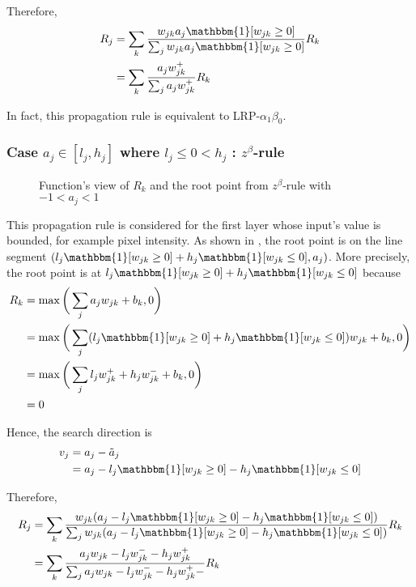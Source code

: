 Therefore, 
\begin{align}
		R_j &=	\sum_k \frac{ w_{jk} a_j \mathbbm{1}[w_{jk}  \ge 0 ]  }{\sum_{j} w_{jk} a_j \mathbbm{1}[ w_{jk}  \ge 0 ]}  R_k\\
		&=	\sum_k  \frac{ a_j  w_{jk}^+   }{\sum_{j}  a_j w_{jk}^+  }  R_k
\end{align}

In fact, this propagation rule is equivalent to LRP-$\alpha_1\beta_0$. 


\subsubsection{Case $a_j \in [l_j , h_j]$ where $l_j \le 0 < h_j $ : $z^\beta$-rule}

\begin{figure}[!htb]
\centering
{}
\caption{Function's view of $R_k$ and the root point from $z^\beta$-rule with $-1 < a_j < 1$ }
\label{fig:zbeta_rule_cases}
\end{figure}
This propagation rule is considered for the first layer whose input's value is bounded, for example pixel intensity. As shown in \addfigure{\ref{fig:zbeta_rule_cases}}, the root point is on the line segment $( l_j \mathbbm{1}[ w_{jk}  \ge 0 ]  + h_j \mathbbm{1}[ w_{jk}  \le 0 ]  , a_j ) $. More precisely, the root point is at $l_j \mathbbm{1}[ w_{jk}  \ge 0 ]  + h_j \mathbbm{1}[ w_{jk}  \le 0 ]$ because
\begin{align}
R_k &= \max \bigg( \sum_j a_j w_{jk } + b_k, 0 \bigg) \\
&=\max \bigg( \sum_j (l_j \mathbbm{1}[ w_{jk}  \ge 0 ]  + h_j \mathbbm{1}[ w_{jk}  \le 0 ] ) w_{jk } + b_k, 0 \bigg) \\
&= \max \bigg( \sum_j l_j w_{jk }^+   + h_j w_{jk }^-  + b_k, 0 \bigg) \\
&= 0
\end{align}

Hence,  the search direction is 
\begin{align}
	v_j &= a_j - \tilde{a}_j \\
	&=a_j  - l_j \mathbbm{1}[ w_{jk}  \ge 0 ]  - h_j \mathbbm{1}[ w_{jk}  \le 0 ]
\end{align}

Therefore, 
\begin{align}
		R_j &=	\sum_k \frac{ w_{jk}  (a_j  - l_j \mathbbm{1}[ w_{jk}  \ge 0 ]  - h_j \mathbbm{1}[ w_{jk}  \le 0 ]) }{\sum_{j} w_{jk}  (a_j  - l_j \mathbbm{1}[ w_{jk}  \ge 0 ] - h_j \mathbbm{1}[ w_{jk}  \le 0 ]) }  R_k\\
		&=	\sum_k  \frac{ a_j  w_{jk} - l_j w_{jk}^- - h_j w_{jk}^+  }{\sum_{j}   a_j  w_{jk} - l_j w_{jk}^- - h_j w_{jk}^+  -}  R_k
\end{align}





